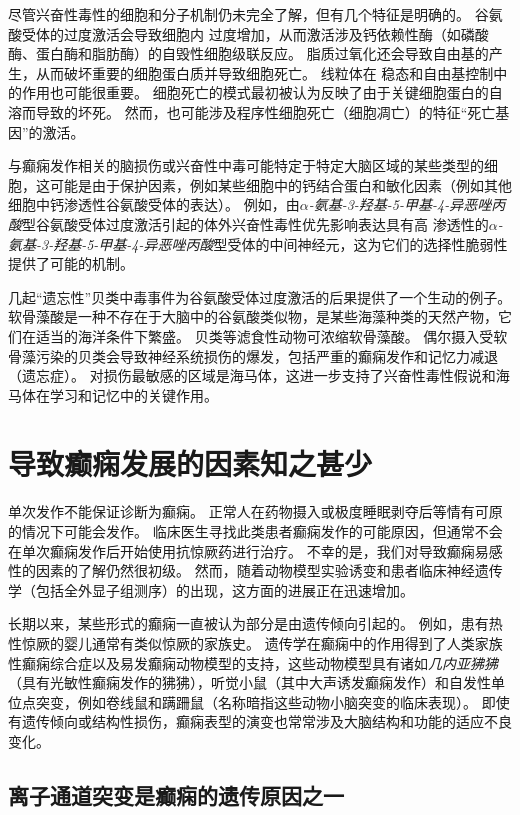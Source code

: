 尽管兴奋性毒性的细胞和分子机制仍未完全了解，但有几个特征是明确的。
谷氨酸受体的过度激活会导致细胞内  过度增加，从而激活涉及钙依赖性酶（如磷酸酶、蛋白酶和脂肪酶）的自毁性细胞级联反应。
脂质过氧化还会导致自由基的产生，从而破坏重要的细胞蛋白质并导致细胞死亡。
线粒体在  稳态和自由基控制中的作用也可能很重要。
细胞死亡的模式最初被认为反映了由于关键细胞蛋白的自溶而导致的坏死。
然而，也可能涉及程序性细胞死亡（细胞凋亡）的特征“死亡基因”的激活。


与癫痫发作相关的脑损伤或兴奋性中毒可能特定于特定大脑区域的某些类型的细胞，这可能是由于保护因素，例如某些细胞中的钙结合蛋白和敏化因素（例如其他细胞中钙渗透性谷氨酸受体的表达）。
例如，由\textit{$\alpha$-氨基-3-羟基-5-甲基-4-异恶唑丙酸}型谷氨酸受体过度激活引起的体外兴奋性毒性优先影响表达具有高  渗透性的\textit{$\alpha$-氨基-3-羟基-5-甲基-4-异恶唑丙酸}型受体的中间神经元，这为它们的选择性脆弱性提供了可能的机制。


几起“遗忘性”贝类中毒事件为谷氨酸受体过度激活的后果提供了一个生动的例子。
软骨藻酸是一种不存在于大脑中的谷氨酸类似物，是某些海藻种类的天然产物，它们在适当的海洋条件下繁盛。
贝类等滤食性动物可浓缩软骨藻酸。
偶尔摄入受软骨藻污染的贝类会导致神经系统损伤的爆发，包括严重的癫痫发作和记忆力减退（遗忘症）。
对损伤最敏感的区域是海马体，这进一步支持了兴奋性毒性假说和海马体在学习和记忆中的关键作用。



\section{导致癫痫发展的因素知之甚少}

单次发作不能保证诊断为癫痫。
正常人在药物摄入或极度睡眠剥夺后等情有可原的情况下可能会发作。
临床医生寻找此类患者癫痫发作的可能原因，但通常不会在单次癫痫发作后开始使用抗惊厥药进行治疗。
不幸的是，我们对导致癫痫易感性的因素的了解仍然很初级。
然而，随着动物模型实验诱变和患者临床神经遗传学（包括全外显子组测序）的出现，这方面的进展正在迅速增加。


长期以来，某些形式的癫痫一直被认为部分是由遗传倾向引起的。
例如，患有热性惊厥的婴儿通常有类似惊厥的家族史。
遗传学在癫痫中的作用得到了人类家族性癫痫综合症以及易发癫痫动物模型的支持，这些动物模型具有诸如\textit{几内亚狒狒}（具有光敏性癫痫发作的狒狒），听觉小鼠（其中大声诱发癫痫发作）和自发性单位点突变，例如卷线鼠和蹒跚鼠（名称暗指这些动物小脑突变的临床表现）。
即使有遗传倾向或结构性损伤，癫痫表型的演变也常常涉及大脑结构和功能的适应不良变化。



\subsection{离子通道突变是癫痫的遗传原因之一}

